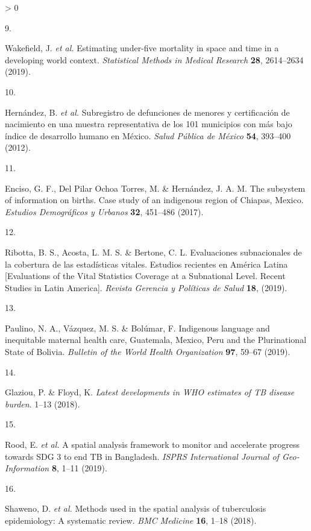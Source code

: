 \documentclass[
]{article}
\newlength{\cslhangindent}
\newlength{\csllabelwidth}
\newenvironment{CSLReferences}[2] %
 {%
  \setlength{\parindent}{0pt}
  \ifodd #1 \everypar{\setlength{\hangindent}{\cslhangindent}}\ignorespaces\fi
  \ifnum #2 > 0
  \setlength{\parskip}{#2\baselineskip}
  \fi
 }%
 {}
\newcommand{\CSLLeftMargin}[1]{\parbox[t]{\csllabelwidth}{#1}}
\newcommand{\CSLRightInline}[1]{\parbox[t]{\linewidth - \csllabelwidth}{#1}\break}
\begin{document}
\begin{CSLReferences}{0}{0}
\leavevmode\hypertarget{ref-Wakefield2019}{}%
\CSLLeftMargin{9. }
\CSLRightInline{Wakefield, J. \emph{et al.} {Estimating under-five mortality in space and time in a developing world context}. \emph{Statistical Methods in Medical Research} \textbf{28}, 2614--2634 (2019).}

\leavevmode\hypertarget{ref-Hernandez2012}{}%
\CSLLeftMargin{10. }
\CSLRightInline{Hernández, B. \emph{et al.} {Subregistro de defunciones de menores y certificaci{ó}n de nacimiento en una muestra representativa de los 101 municipios con m{á}s bajo {í}ndice de desarrollo humano en M{é}xico}. \emph{Salud P{ú}blica de M{é}xico} \textbf{54}, 393--400 (2012).}

\leavevmode\hypertarget{ref-Enciso2017}{}%
\CSLLeftMargin{11. }
\CSLRightInline{Enciso, G. F., Del Pilar Ochoa Torres, M. \& Hernández, J. A. M. {The subsystem of information on births. Case study of an indigenous region of Chiapas, Mexico}. \emph{Estudios Demogr{á}ficos y Urbanos} \textbf{32}, 451--486 (2017).}

\leavevmode\hypertarget{ref-Ribotta2019}{}%
\CSLLeftMargin{12. }
\CSLRightInline{Ribotta, B. S., Acosta, L. M. S. \& Bertone, C. L. {Evaluaciones subnacionales de la cobertura de las estad{í}sticas vitales. Estudios recientes en Am{é}rica Latina {[}Evaluations of the Vital Statistics Coverage at a Subnational Level. Recent Studies in Latin America{]}}. \emph{Revista Gerencia y Pol{í}ticas de Salud} \textbf{18}, (2019).}

\leavevmode\hypertarget{ref-Paulino2019}{}%
\CSLLeftMargin{13. }
\CSLRightInline{Paulino, N. A., Vázquez, M. S. \& Bolúmar, F. {Indigenous language and inequitable maternal health care, Guatemala, Mexico, Peru and the Plurinational State of Bolivia}. \emph{Bulletin of the World Health Organization} \textbf{97}, 59--67 (2019).}

\leavevmode\hypertarget{ref-Glaziou2018a}{}%
\CSLLeftMargin{14. }
\CSLRightInline{Glaziou, P. \& Floyd, K. \emph{{Latest developments in WHO estimates of TB disease burden}}. 1--13 (2018).}

\leavevmode\hypertarget{ref-Rood2019}{}%
\CSLLeftMargin{15. }
\CSLRightInline{Rood, E. \emph{et al.} {A spatial analysis framework to monitor and accelerate progress towards SDG 3 to end TB in Bangladesh}. \emph{ISPRS International Journal of Geo-Information} \textbf{8}, 1--11 (2019).}

\leavevmode\hypertarget{ref-Shaweno2018}{}%
\CSLLeftMargin{16. }
\CSLRightInline{Shaweno, D. \emph{et al.} {Methods used in the spatial analysis of tuberculosis epidemiology: A systematic review}. \emph{BMC Medicine} \textbf{16}, 1--18 (2018).}


\end{CSLReferences}
\end{document}
